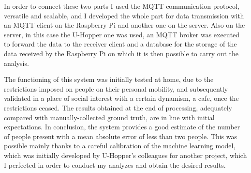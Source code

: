 In order to connect these two parts I used the MQTT communication protocol, versatile and scalable, and I developed the whole part for data transmission with an MQTT client on the Raspberry Pi and another one on the server. Also on the server, in this case the U-Hopper one was used, an MQTT broker was executed to forward the data to the receiver client and a database for the storage of the data received by the Raspberry Pi on which it is then possible to carry out the analysis.

The functioning of this system was initially tested at home, due to the restrictions imposed on people on their personal mobility, and subsequently validated in a place of social interest with a certain dynamism, a cafe, once the restrictions ceased. The results obtained at the end of processing, adequately compared with manually-collected ground truth, are in line with initial expectations. In conclusion, the system provides a good estimate of the number of people present with a mean absolute error of less than two people. This was possible mainly thanks to a careful calibration of the machine learning model, which was initially developed by U-Hopper's colleagues for another project, which I perfected in order to conduct my analyzes and obtain the desired results.
